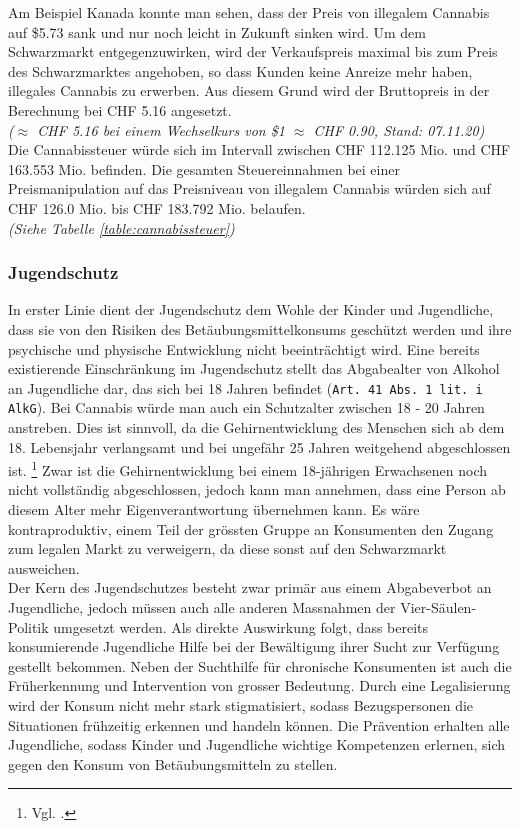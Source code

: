 \documentclass[../main.tex]{subfiles}
\begin{document}
     \noindent	 
	 Am Beispiel Kanada konnte man sehen, dass der Preis von illegalem Cannabis auf \$5.73 sank und nur noch leicht in Zukunft sinken wird.
	 Um dem Schwarzmarkt entgegenzuwirken, wird der Verkaufspreis maximal bis zum Preis des Schwarzmarktes angehoben, so dass Kunden keine Anreize mehr haben, illegales Cannabis zu erwerben.
	 Aus diesem Grund wird der Bruttopreis in der Berechnung bei CHF 5.16 angesetzt.\\
	 \textit{($\approx$ CHF 5.16 bei einem Wechselkurs von \$1 $\approx$ CHF 0.90, Stand: 07.11.20)} \\
	 
	 \noindent
	 Die Cannabissteuer würde sich im Intervall zwischen CHF 112.125 Mio. und CHF 163.553 Mio. befinden.	 
	 Die gesamten Steuereinnahmen bei einer Preismanipulation auf das Preisniveau von illegalem Cannabis würden sich auf CHF 126.0 Mio. bis CHF 183.792 Mio. belaufen.\\
	 \textit{(Siehe Tabelle \ref{table:cannabissteuer})}
	 
	 \subsubsection{Jugendschutz}
	 In erster Linie dient der Jugendschutz dem Wohle der Kinder und Jugendliche, dass sie von den Risiken des Betäubungsmittelkonsums geschützt werden und ihre psychische und physische Entwicklung nicht beeinträchtigt wird. 
	 Eine bereits existierende Einschränkung im Jugendschutz stellt das Abgabealter von Alkohol an Jugendliche dar, das sich bei 18 Jahren befindet (\texttt{Art. 41 Abs. 1 lit. i AlkG}). 
	 Bei Cannabis würde man auch ein Schutzalter zwischen 18 - 20 Jahren anstreben. 
	 Dies ist sinnvoll, da die Gehirnentwicklung des Menschen sich ab dem 18. Lebensjahr verlangsamt und bei ungefähr 25 Jahren weitgehend abgeschlossen ist.%
	 \footnote{Vgl. \cite{arain-2013}.}
	 Zwar ist die Gehirnentwicklung bei einem 18-jährigen Erwachsenen noch nicht vollständig abgeschlossen, jedoch kann man annehmen, dass eine Person ab diesem Alter mehr Eigenverantwortung übernehmen kann.
	 Es wäre kontraproduktiv, einem Teil der grössten Gruppe an Konsumenten den Zugang zum legalen Markt zu verweigern, da diese sonst auf den Schwarzmarkt ausweichen.\\
	 
	 \noindent
	 Der Kern des Jugendschutzes besteht zwar primär aus einem Abgabeverbot an Jugendliche, jedoch müssen auch alle anderen Massnahmen der Vier-Säulen-Politik umgesetzt werden. 
	 Als direkte Auswirkung folgt, dass bereits konsumierende Jugendliche Hilfe bei der Bewältigung ihrer Sucht zur Verfügung gestellt bekommen. 
	 Neben der Suchthilfe für chronische Konsumenten ist auch die Früherkennung und Intervention von grosser Bedeutung. 
	 Durch eine Legalisierung wird der Konsum nicht mehr stark stigmatisiert, sodass Bezugspersonen die Situationen frühzeitig erkennen und handeln können. 
	 Die Prävention erhalten alle Jugendliche, sodass Kinder und Jugendliche wichtige Kompetenzen erlernen, sich gegen den Konsum von Betäubungsmitteln zu stellen.  
	 
\end{document}
